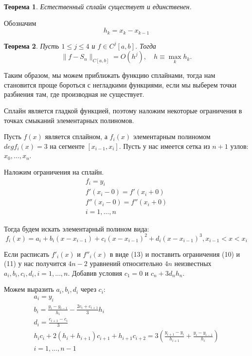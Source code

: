 \documentclass{article}
\newtheorem{theorem}{Теорема}
\begin{document}
\begin{description}
    \begin{theorem}
        Естественный сплайн существует и единственен.
    \end{theorem}

    Обозначим
    \begin{equation}
        h_k = x_k - x_{k-1}
    \end{equation}

    \begin{theorem}
        Пусть \(1 \leq j \leq 4\) и \(f \in C^j[a, b]\). Тогда
        \begin{equation}
            \|f - S_n\|_{C[a, b]} = O(h^j), \quad h \equiv \max_k h_k.
            \label{eq:example}
        \end{equation}
    \end{theorem}

    Таким образом, мы можем приближать функцию сплайнами, тогда нам становится проще бороться с негладкими функциями, если мы выберем точки разбиения там, где производная не существует.
    
    Сплайн является гладкой функцией, поэтому наложим некоторые ограничения в точках смыканий элементарных полиномов. 
    
    Пусть \(f(x)\) является сплайном, а \(f_i(x)\) элементарным полиномом \(deg f_i(x) = 3\) на сегменте \([x_{i-1}, x_i]\). Пусть у нас имеется сетка из \(n+1\) узлов: \(x_0,\dots,x_n\).
    
    Наложим ограничения на сплайн.
    \begin{align}
    	f_i = y_i \\
    	f'(x_i-0) = f'(x_i+0) \\
    	f''(x_i-0) = f''(x_i+0) \\
    	i = 1,\dots,n
    \end{align}
    
    Тогда будем искать элементарный полином вида:
    \begin{equation}
    	f_i(x) = a_i + b_i(x - x_{i-1}) + c_i(x - x_{i-1})^2 + d_i(x - x_{i-1})^3, x_{i-1} < x < x_i
    \end{equation}
    
    Если расписать \(f'_i(x)\) и \(f''_i(x)\) в виде (13) и поставить ограничения (10) и (11) у нас получится \(4n-2\) уравнений относительно \(4n\) неизвестных 
    \(a_i,b_i,c_i,d_i, i = 1,\dots,n\). Добавив условия \(c_1 = 0\) и \(c_n + 3 d_n h_n\). 
    
    Можем выразить \(a_i, b_i, d_i\) через \(c_i\):
    \begin{align}
    	a_i = y_i \\
    	b_i = \frac{y_i - y_{i-1}}{h_i} - \frac{2 c_i + c_{i+1}}{3} h_i \\
    	d_i = \frac{c_{i+1} - c_i}{3} \\
    	h_i c_i + 2(h_i + h_{i+1}) c_{i+1} + h_{i+1} c_{i+2} = 3 (\frac{y_{i+1} - y_i}{h_{i+1}} + \frac{y_i - y_{i-1}}{h_i}) \\
    	i = 1,\dots,n-1
    \end{align}
    

\end{description}
\end{document}
